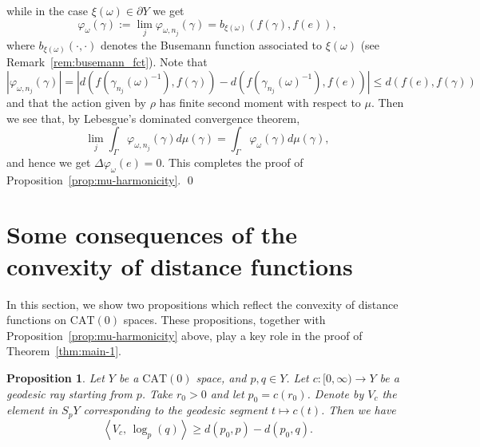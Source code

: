 \documentclass[12pt]{amsart}
\numberwithin{equation}{section}
\theoremstyle{plain}
\newtheorem{Proposition}[Theorem]{Proposition}
\theoremstyle{definition}
\theoremstyle{remark}
\newcommand{\tcprj}{\log}
\newcommand{\inner}[2]{\left\langle #1,\, #2 \right\rangle}
\newcommand{\cat}[1]{\mathrm{CAT}(#1)}
\begin{document}
while in the case $\xi(\omega) \in \partial Y$ we get
 \begin{equation*}
 \varphi_{\omega}(\gamma):= \lim_j \varphi_{\omega, n_j}(\gamma) 
 = b_{\xi(\omega)}(f(\gamma), f(e)), 
 \end{equation*}
where $b_{\xi(\omega)}(\cdot, \cdot)$ denotes the 
Busemann function associated to $\xi(\omega)$ 
(see Remark~\ref{rem:busemann_fct}).  
Note that
\begin{equation*}
 |\varphi_{\omega,n_j}(\gamma)| = 
 |d(f(\gamma_{n_j}(\omega)^{-1}),f(\gamma)) - 
  d(f(\gamma_{n_j}(\omega)^{-1}),f(e))| \leq d(f(e),f(\gamma))
\end{equation*}
and that 
the action given by $\rho$ has finite second moment with respect
to $\mu$. 
Then we see that, by Lebesgue's dominated convergence theorem, 
\begin{equation*}
 \lim_j \int_{\Gamma} \varphi_{\omega,n_j}(\gamma) d\mu(\gamma)
 = \int_{\Gamma} \varphi_{\omega}(\gamma) d\mu(\gamma), 
\end{equation*}
and hence we get $\Delta \varphi_{\omega} (e)=0$.
This completes the proof of Proposition~\ref{prop:mu-harmonicity}. 
\qed




\section{Some consequences of the convexity of distance functions}
\label{sec:convexity_of_distance_and_Busemann_fct}

In this section, we show two propositions which reflect the
convexity of distance functions on $\cat{0}$ spaces. 
These propositions, together with Proposition~\ref{prop:mu-harmonicity}
above,  play a key role in the proof of Theorem~\ref{thm:main-1}. 

%
%
\begin{Proposition}
\label{prop:convexity_of_distance_sphere}
 Let $Y$ be a $\cat{0}$ space,  and $p, q \in Y$. 
 Let $c\colon [0,\infty)\longrightarrow Y$ be a geodesic ray starting
 from $p$. 
 Take $r_0>0$ and let $p_0=c(r_0)$. 
 Denote by $V_c$ the element in $S_pY$ corresponding to the geodesic
 segment $t \mapsto c(t)$.  
 Then we have
\begin{equation*}
   \inner{V_c}{\tcprj_p(q)}  \geq d(p_0,p)-d(p_0,q).
\end{equation*}
\end{Proposition}
\end{document}
